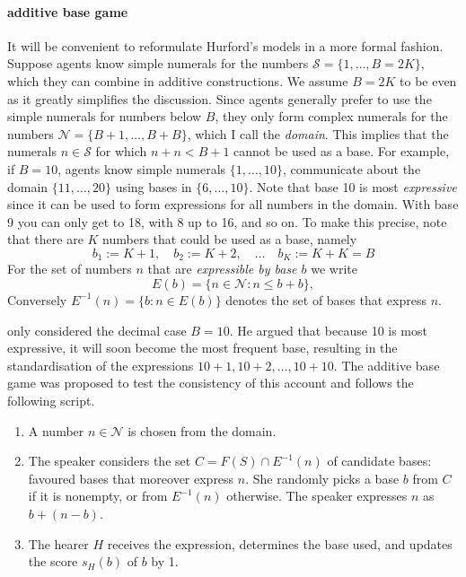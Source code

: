 \documentclass{../src/bcthesispart}
\begin{document}
\paragraph{additive base game}

It will be convenient to reformulate Hurford’s models in a more formal fashion.
Suppose agents know simple numerals for the numbers $\mathcal{S} = \{1, \dots, B=2K\}$, which they can combine in additive constructions.
We assume $B = 2K$ to be even as it greatly simplifies the discussion.
Since agents generally prefer to use the simple numerals for numbers below $B$, they only form complex numerals for the numbers $\mathcal{N} = \{ B+1, \dots, B+B \}$, which I call the \emph{domain}.
This implies that the numerals $n \in \mathcal{S}$ for which $n+n < B+1$ cannot be used as a base. 
For example, if $B=10$, agents know simple numerals $\{1, \dots, 10\}$, communicate about the domain $\{11, \dots, 20\}$ using bases in $\{6, \dots, 10\}$.
Note that base 10 is most \emph{expressive} since it can be used to form expressions for all numbers in the domain.
With base 9 you can only get to 18, with 8 up to 16, and so on. 
To make this precise, note that there are $K$ numbers that could be used as a base, namely
\begin{equation}
	b_1 := K+1, \quad b_2 := K+2, \quad \dots \quad b_K := K+K =B
\end{equation}
For the set of numbers $n$ that are \emph{expressible by base $b$} we write
\begin{equation}
	E(b) 
		= \{ n \in \mathcal{N}: n \le b+b \},
\end{equation}
Conversely $E^{-1}(n) = \{b : n \in E(b)\}$ denotes the set of bases that express $n$.




\textcite{Hurford1987} only considered the decimal case $B=10$.
He argued that because 10 is most expressive, it will soon become the most frequent base, resulting in the standardisation of the expressions $10+1, 10+2, \dots, 10+10$.
The additive base game was proposed to test the consistency of this account and follows the following script.
\begin{enumerate}
	\item A number $n\in\mathcal{N}$ is chosen from the domain.

	\item The speaker considers the set $C = F(S) \cap E^{-1}(n)$ of candidate bases: favoured bases that moreover express $n$. She randomly picks a base $b$ from $C$ if it is nonempty, or from $E^{-1}(n)$ otherwise. The speaker expresses $n$ as $b + (n-b)$.
		
	\item The hearer $H$ receives the expression, determines the base used,  and updates the score $s_H(b)$ of $b$ by 1.
\end{enumerate}
\end{document}
